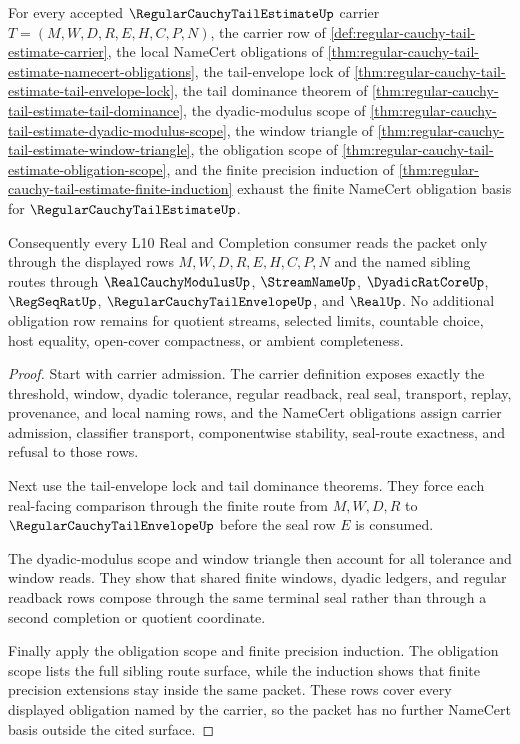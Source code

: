 \begin{theorem}
\label{thm:regular-cauchy-tail-estimate-obligation-basis}
For every accepted $\RegularCauchyTailEstimateUp$ carrier $T=(M,W,D,R,E,H,C,P,N)$, the carrier row of \autoref{def:regular-cauchy-tail-estimate-carrier}, the local NameCert obligations of \autoref{thm:regular-cauchy-tail-estimate-namecert-obligations}, the tail-envelope lock of \autoref{thm:regular-cauchy-tail-estimate-tail-envelope-lock}, the tail dominance theorem of \autoref{thm:regular-cauchy-tail-estimate-tail-dominance}, the dyadic-modulus scope of \autoref{thm:regular-cauchy-tail-estimate-dyadic-modulus-scope}, the window triangle of \autoref{thm:regular-cauchy-tail-estimate-window-triangle}, the obligation scope of \autoref{thm:regular-cauchy-tail-estimate-obligation-scope}, and the finite precision induction of \autoref{thm:regular-cauchy-tail-estimate-finite-induction} exhaust the finite NameCert obligation basis for $\RegularCauchyTailEstimateUp$.

Consequently every L10 Real and Completion consumer reads the packet only through the displayed rows $M,W,D,R,E,H,C,P,N$ and the named sibling routes through $\RealCauchyModulusUp$, $\StreamNameUp$, $\DyadicRatCoreUp$, $\RegSeqRatUp$, $\RegularCauchyTailEnvelopeUp$, and $\RealUp$. No additional obligation row remains for quotient streams, selected limits, countable choice, host equality, open-cover compactness, or ambient completeness.
\end{theorem}
\begin{proof}
Start with carrier admission. The carrier definition exposes exactly the threshold, window, dyadic tolerance, regular readback, real seal, transport, replay, provenance, and local naming rows, and the NameCert obligations assign carrier admission, classifier transport, componentwise stability, seal-route exactness, and refusal to those rows.

Next use the tail-envelope lock and tail dominance theorems. They force each real-facing comparison through the finite route from $M,W,D,R$ to $\RegularCauchyTailEnvelopeUp$ before the seal row $E$ is consumed.

The dyadic-modulus scope and window triangle then account for all tolerance and window reads. They show that shared finite windows, dyadic ledgers, and regular readback rows compose through the same terminal seal rather than through a second completion or quotient coordinate.

Finally apply the obligation scope and finite precision induction. The obligation scope lists the full sibling route surface, while the induction shows that finite precision extensions stay inside the same packet. These rows cover every displayed obligation named by the carrier, so the packet has no further NameCert basis outside the cited surface.
\end{proof}

